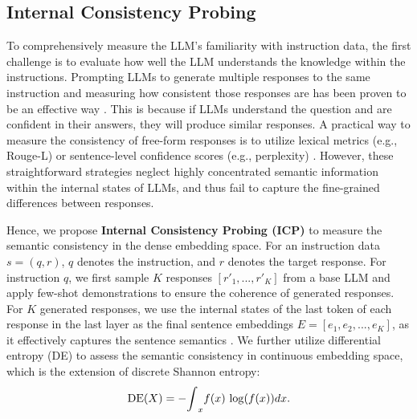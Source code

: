 %







\subsection{Internal Consistency Probing}
\label{section:IKP}
To comprehensively measure the LLM's familiarity with instruction data, the first challenge is to evaluate how well the LLM understands the knowledge within the instructions.
Prompting LLMs to generate multiple responses to the same instruction and measuring how consistent those responses are has been proven to be an effective way \citep{wang2023selfconsistency, chen2024inside}.
This is because if LLMs understand the question and are confident in their answers, they will produce similar responses.
A practical way to measure the consistency of free-form responses is to utilize lexical metrics (e.g., Rouge-L) \citep{DBLP:journals/tmlr/LinT024} or sentence-level confidence scores (e.g., perplexity) \citep{ren2023outofdistribution}.
However, these straightforward strategies neglect highly concentrated semantic information within the internal states of LLMs, and thus fail to capture the fine-grained differences between responses.

Hence, we propose \textbf{Internal Consistency Probing (ICP)} to measure the semantic consistency in the dense embedding space.
For an instruction data $s=(q, r)$, $q$ denotes the instruction, and $r$ denotes the target response.
For instruction $q$, we first sample $K$ responses $[r'_1,...,r'_K]$ from a base LLM and apply few-shot demonstrations \citep{lin2024the} to ensure the coherence of generated responses.
For $K$ generated responses, we use the internal states of the last token of each response in the last layer as the final sentence embeddings $E=[e_1,e_2,...,e_K]$, as it effectively captures the sentence semantics \citep{azaria2023the}.
We further utilize differential entropy (DE) to assess the semantic consistency in continuous embedding space, which is the extension of discrete Shannon entropy:
\begin{align}
{\rm DE}(X)=-{\rm \int}_xf(x)~{\rm log}(f(x))dx.
\end{align}


